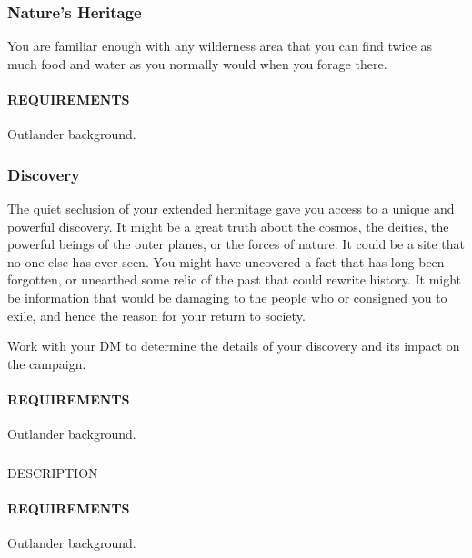     \subsubsection{Nature's Heritage} \label{feat::naturesheritage}
        You are familiar enough with any wilderness area that you can find twice as much food and water as you normally would when you forage there.
        \paragraph{REQUIREMENTS} Outlander background.

    \subsubsection{Discovery} \label{feat::discovery} %
        The quiet seclusion of your extended hermitage gave you access to a unique and powerful discovery.
        It might be a great truth about the cosmos, the deities, the powerful beings of the outer planes, or the forces of nature.
        It could be a site that no one else has ever seen.
        You might have uncovered a fact that has long been forgotten, or unearthed some relic of the past that could rewrite history.
        It might be information that would be damaging to the people who or consigned you to exile, and hence the reason for your return to society.

        Work with your DM to determine the details of your discovery and its impact on the campaign.
        \paragraph{REQUIREMENTS} Outlander background.

    \subsubsection{} \label{feat::NAME}
        DESCRIPTION
        \paragraph{REQUIREMENTS} Outlander background.



